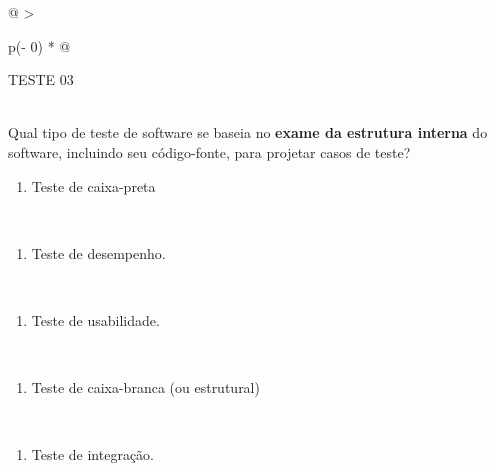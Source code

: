 \documentclass[
]{book}
\providecommand{\tightlist}{%
  \setlength{\itemsep}{0pt}\setlength{\parskip}{0pt}}
\begin{document}
\begin{longtable}[]{@{}
  >{\raggedright\arraybackslash}p{(\columnwidth - 0\tabcolsep) * }@{}}
\toprule\noalign{}
\begin{minipage}[b]{\linewidth}\raggedright
TESTE 03
\end{minipage} \\
\midrule\noalign{}
\endhead
\bottomrule\noalign{}
\endlastfoot
Qual tipo de teste de software se baseia no \textbf{exame da estrutura interna} do software, incluindo seu código-fonte, para projetar casos de teste? \\
\begin{minipage}[t]{\linewidth}\raggedright
\begin{enumerate}
\def\labelenumi{\alph{enumi})}
\tightlist
\item
  Teste de caixa-preta
\end{enumerate}
\end{minipage} \\
\begin{minipage}[t]{\linewidth}\raggedright
\begin{enumerate}
\def\labelenumi{\alph{enumi})}
\setcounter{enumi}{1}
\tightlist
\item
  Teste de desempenho.
\end{enumerate}
\end{minipage} \\
\begin{minipage}[t]{\linewidth}\raggedright
\begin{enumerate}
\def\labelenumi{\alph{enumi})}
\setcounter{enumi}{2}
\tightlist
\item
  Teste de usabilidade.
\end{enumerate}
\end{minipage} \\
\begin{minipage}[t]{\linewidth}\raggedright
\begin{enumerate}
\def\labelenumi{\alph{enumi})}
\setcounter{enumi}{3}
\tightlist
\item
  Teste de caixa-branca (ou estrutural)
\end{enumerate}
\end{minipage} \\
\begin{minipage}[t]{\linewidth}\raggedright
\begin{enumerate}
\def\labelenumi{\alph{enumi})}
\setcounter{enumi}{4}
\tightlist
\item
  Teste de integração.
\end{enumerate}
\end{minipage} \\
\end{longtable}
\end{document}
